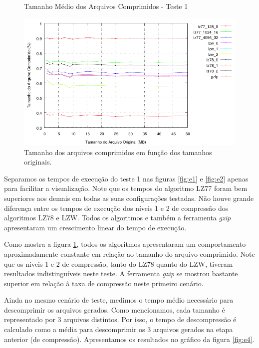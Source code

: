 \documentclass[]{article}
\newcommand{\figref}[1]{figura \ref{#1}}
\begin{document}
\begin{figure}
	{\centering Tamanho Médio dos Arquivos Comprimidos - Teste 1\par}
	\includegraphics{images/natural_taxa}
\caption{Tamanho dos arquivos comprimidos em função dos tamanhos originais.}
\label{fig:e3}
\end{figure}

Separamos os tempos de execução do teste 1 nas figuras \ref{fig:e1} e \ref{fig:e2} apenas para facilitar a visualização. Note que os tempos do algoritmo LZ77 foram bem superiores aos demais em todas as suas configurações testadas. Não houve grande diferença entre os tempos de execução dos níveis 1 e 2 de compressão dos algoritmos LZ78 e LZW. Todos os algoritmos e também a ferramenta \textit{gzip} apresentaram um crescimento linear do tempo de execução.

Como mostra a \figref{fig:e3}, todos os algoritmos apresentaram um comportamento aproximadamente constante em relação ao tamanho do arquivo comprimido. Note que os níveis 1 e 2 de compressão, tanto do LZ78 quanto do LZW, tiveram resultados indistinguíveis neste teste. A ferramenta \textit{gzip} se mostrou bastante superior em relação à taxa de compressão neste primeiro cenário.

Ainda no mesmo cenário de teste, medimos o tempo médio necessário para descomprimir os arquivos gerados. Como mencionamos, cada tamanho é representado por 3 arquivos distintos. Por isso, o tempo de descompressão é calculado como a média para descomprimir os 3 arquivos gerados na etapa anterior (de compressão). Apresentamos os resultados no gráfico da \figref{fig:e4}.
\end{document}
